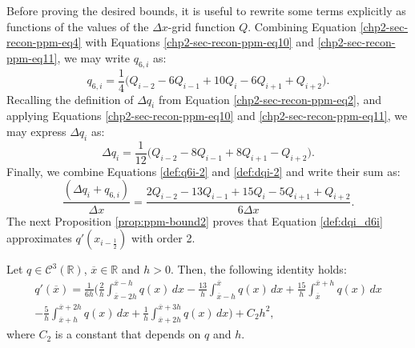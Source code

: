 Before proving the desired bounds, it is useful to rewrite some terms
explicitly as functions of the values of the $\Delta x$-grid function $Q$.
Combining Equation \eqref{chp2-sec-recon-ppm-eq4} with Equations
\eqref{chp2-sec-recon-ppm-eq10} and \eqref{chp2-sec-recon-ppm-eq11}, 
we may write $q_{6,i}$ as:
\begin{equation}
	\label{def:q6i-2}
	q_{6,i} = \frac{1}{4} \bigg( Q_{i-2} - 6Q_{i-1} + 10Q_{i} -6Q_{i+1}  + Q_{i+2} \bigg).
\end{equation}
Recalling the definition of $\Delta q_i$ from Equation \eqref{chp2-sec-recon-ppm-eq2},
and applying Equations \eqref{chp2-sec-recon-ppm-eq10} and \eqref{chp2-sec-recon-ppm-eq11}, 
we may express $\Delta q_i$ as:
\begin{equation}
	\label{def:dqi-2}
	\Delta q_i = \frac{1}{12} \bigg(Q_{i-2} -8Q_{i-1} + 8Q_{i+1} -Q_{i+2} \bigg).
\end{equation}
Finally, we combine Equations \eqref{def:q6i-2} and \eqref{def:dqi-2} and write their sum as:
\begin{equation} 
	\label{def:dqi_d6i}
	\frac{(\Delta q_i + q_{6, i})}{\Delta x} = 
	\frac{2Q_{i-2}-13Q_{i-1} +15Q_i -5Q_{i+1} + Q_{i+2}}{6\Delta x}.
\end{equation}
The next Proposition \ref{prop:ppm-bound2} proves that Equation \eqref{def:dqi_d6i}
approximates $q'(x_{i-\frac{1}{2}})$ with order 2.
\begin{prop}
	\label{prop:ppm-bound2}
	Let $q \in \mathcal{C}^{3}(\mathbb{R})$, $\overline{x}\in \mathbb{R}$ and $h>0$.
	Then, the following identity holds:
	\begin{equation}
		\begin{split}
		\label{prop:ppm-bound2-eq1}
		q'(\overline{x} ) = \frac{1}{6h}
		\bigg( \frac{2}{h} \int_{\overline{x}-2h}^{\overline{x}-h} q(x) \,dx 
		      -\frac{13}{h}\int_{\overline{x}-h}^{\overline{x}} q(x) \,dx   
		      +\frac{15}{h}\int_{\overline{x}}^{\overline{x}+h} q(x) \,dx  \\ 
		      -\frac{5}{h} \int_{\overline{x}+h}^{\overline{x}+2h} q(x) \,dx   
		      +\frac{1}{h} \int_{\overline{x}+2h}^{\overline{x}+3h} q(x) \,dx   
		\bigg) + C_2h^2,
		\end{split}
	\end{equation}
	where $C_2$ is a constant that depends on $q$ and $h$.
\end{prop}

